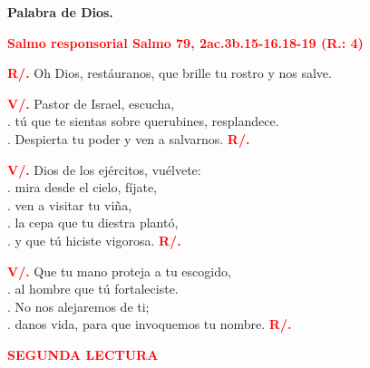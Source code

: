 \documentclass[12pt, letterpaper]{report}
\begin{document}
{\bfseries Palabra de Dios.}

\Large {\bfseries \textcolor{red}{Salmo responsorial \hspace{1cm} Salmo 79, 2ac.3b.15-16.18-19 (R.: 4)}}

\Large {\bfseries \textcolor{red}{R/.}} \hspace{1cm} Oh Dios, rest\'auranos, que brille tu rostro y nos salve.

{\bfseries \textcolor{red}{V/.}} \hspace{1cm} Pastor de Israel, escucha,\\
. \hspace{2.5cm} t\'u que te sientas sobre querubines, resplandece.\\
. \hspace{2.5cm} Despierta tu poder y ven a salvarnos.
\hspace{1cm} {\bfseries \textcolor{red}{R/.}}

{\bfseries \textcolor{red}{V/.}} \hspace{1cm} Dios de los ej\'ercitos, vu\'elvete:\\
. \hspace{2.5cm} mira desde el cielo, f\'ijate,\\
. \hspace{2.5cm} ven a visitar tu vi\~na,\\
. \hspace{2.5cm} la cepa que tu diestra plant\'o,\\
. \hspace{2.5cm} y que t\'u hiciste vigorosa.
\hspace{1cm} {\bfseries \textcolor{red}{R/.}}

{\bfseries \textcolor{red}{V/.}} \hspace{1cm} Que tu mano proteja a tu escogido,\\
. \hspace{2.5cm} al hombre que t\'u fortaleciste.\\
. \hspace{2.5cm} No nos alejaremos de ti;\\
. \hspace{2.5cm} danos vida, para que invoquemos tu nombre.
\hspace{1cm} {\bfseries \textcolor{red}{R/.}}

\newpage

\begin{center}
\Large {\bfseries \textcolor{red}{SEGUNDA LECTURA}}
\end{center}
\end{document}
